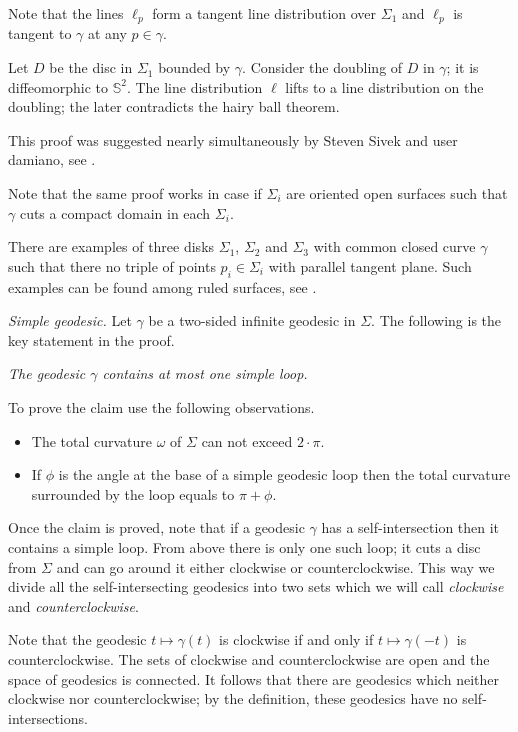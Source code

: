 Note that the lines $\ell_p$ form a tangent line distribution over $\Sigma_1$
and $\ell_p$ is tangent to $\gamma$ at any $p\in\gamma$.

Let $D$ be the disc in $\Sigma_1$ bounded by $\gamma$.
Consider the doubling of $D$ in $\gamma$;
it is diffeomorphic to $\mathbb S^2$.
The line distribution $\ell$ lifts to a line distribution on the doubling;
the later contradicts the hairy ball theorem.

 This proof was suggested nearly simultaneously by Steven Sivek and user damiano, see \cite{two-discs}.

Note that the same proof works in case if $\Sigma_i$ are oriented open surfaces such that $\gamma$ cuts a compact domain in each $\Sigma_i$.

There are examples of three disks $\Sigma_1$, $\Sigma_2$ and $\Sigma_3$
with common closed curve $\gamma$ such that there no triple of points $p_i\in\Sigma_i$ with parallel tangent plane.
Such examples can be found among ruled surfaces, see \cite{three-discs}.



\textit{Simple geodesic.}
Let $\gamma$ be a two-sided infinite geodesic in $\Sigma$.
The following is the key statement in the proof.

{\it The geodesic $\gamma$ contains at most one simple loop.}
\medskip

To prove the claim use the following observations.
\begin{itemize}
\item The total curvature $\omega$ of $\Sigma$ can not exceed $2\cdot\pi$.
\item If $\phi$ is the angle at the base of a simple geodesic loop then the total curvature surrounded by the loop equals to $\pi+\phi$.
\end{itemize}

Once the claim is proved, note that if a geodesic $\gamma$ has a self-intersection
then it contains a simple loop.
From above there is only one such loop;
it cuts a disc from $\Sigma$ 
and can go around it either clockwise or counterclockwise.
This way we divide all the self-intersecting geodesics 
into two sets which we will call \emph{clockwise} and \emph{counterclockwise}.

Note that the geodesic $t\mapsto \gamma(t)$ is clockwise 
if and only if 
$t\mapsto \gamma(-t)$
is counterclockwise.
The sets of clockwise and counterclockwise are open and the space of geodesics is connected. 
It follows that there are geodesics which neither clockwise nor counterclockwise;
by the definition, these geodesics have no self-intersections.

